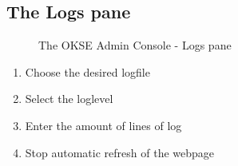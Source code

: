 
\clearpage

\subsection{The Logs pane}
\begin{center}
  \begin{figure}[ht!]
    \caption{The OKSE Admin Console - Logs pane} 
    \label{fig:OKSE Admin Console - Logs pane}
  \end{figure}
\end{center}
\begin{enumerate}
\item Choose the desired logfile
\item Select the loglevel
\item Enter the amount of lines of log
\item Stop automatic refresh of the webpage
\end{enumerate}

